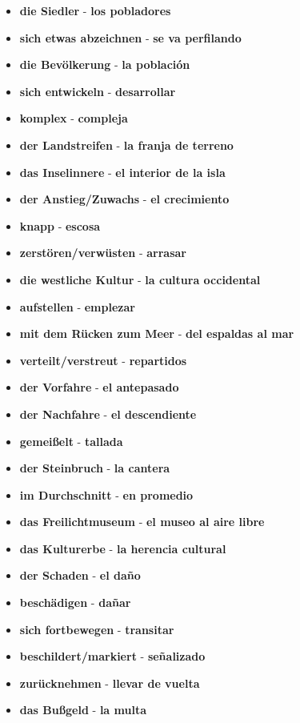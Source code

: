 \documentclass{article}
\begin{document}
\begin{multicols}{2}
\begin{itemize}
		\item{\textbf{die Siedler} - \textbf{los pobladores}}
		\item{\textbf{sich etwas abzeichnen} - \textbf{se va perfilando}}
		\item{\textbf{die Bevölkerung} - \textbf{la población}}
		\item{\textbf{sich entwickeln} - \textbf{desarrollar}}
		\item{\textbf{komplex} - \textbf{compleja}}
		\item{\textbf{der Landstreifen} - \textbf{la franja de terreno}}
		\item{\textbf{das Inselinnere} - \textbf{el interior de la isla}}
		\item{\textbf{der Anstieg/Zuwachs} - \textbf{el crecimiento}}
		\item{\textbf{knapp} - \textbf{escosa}}
		\item{\textbf{zerstören/verwüsten} - \textbf{arrasar}}
		\item{\textbf{die westliche Kultur} - \textbf{la cultura occidental}}
		\item{\textbf{aufstellen} - \textbf{emplezar}}
		\item{\textbf{mit dem Rücken zum Meer} - \textbf{del espaldas al mar}}
		\item{\textbf{verteilt/verstreut} - \textbf{repartidos}}
		\item{\textbf{der Vorfahre} - \textbf{el antepasado}}
		\item{\textbf{der Nachfahre} - \textbf{el descendiente}}
		\item{\textbf{gemeißelt} - \textbf{tallada}}
		\item{\textbf{der Steinbruch} - \textbf{la cantera}}
		\item{\textbf{im Durchschnitt} - \textbf{en promedio}}
		\item{\textbf{das Freilichtmuseum} - \textbf{el museo al aire libre}}
		\item{\textbf{das Kulturerbe} - \textbf{la herencia cultural}}
		\item{\textbf{der Schaden} - \textbf{el daño}}
		\item{\textbf{beschädigen} - \textbf{dañar}}
		\item{\textbf{sich fortbewegen} - \textbf{transitar}}
		\item{\textbf{beschildert/markiert} - \textbf{señalizado}}
		\item{\textbf{zurücknehmen} - \textbf{llevar de vuelta}}
		\item{\textbf{das Bußgeld} - \textbf{la multa}}

\end{itemize}
\end{multicols}
\end{document}
